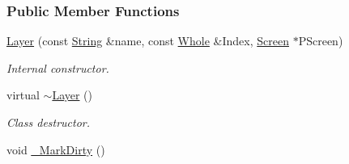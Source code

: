 \subsubsection*{Public Member Functions}
\begin{DoxyCompactItemize}
\item 
\hyperlink{classMezzanine_1_1UI_1_1Layer_aa614cada4a9187cd860cfc911ebf3448}{Layer} (const \hyperlink{namespaceMezzanine_acf9fcc130e6ebf08e3d8491aebcf1c86}{String} \&name, const \hyperlink{namespaceMezzanine_adcbb6ce6d1eb4379d109e51171e2e493}{Whole} \&Index, \hyperlink{classMezzanine_1_1UI_1_1Screen}{Screen} $\ast$PScreen)
\begin{DoxyCompactList}\small\item\em Internal constructor. \item\end{DoxyCompactList}\item 
\hypertarget{classMezzanine_1_1UI_1_1Layer_a8f900ee91964b4103ce369e82a7a0739}{
virtual \hyperlink{classMezzanine_1_1UI_1_1Layer_a8f900ee91964b4103ce369e82a7a0739}{$\sim$Layer} ()}
\label{classMezzanine_1_1UI_1_1Layer_a8f900ee91964b4103ce369e82a7a0739}

\begin{DoxyCompactList}\small\item\em Class destructor. \item\end{DoxyCompactList}\item 
\hypertarget{classMezzanine_1_1UI_1_1Layer_ad618bda408662cf17efa96cdbc5debd5}{
void \hyperlink{classMezzanine_1_1UI_1_1Layer_ad618bda408662cf17efa96cdbc5debd5}{\_\-MarkDirty} ()}
\label{classMezzanine_1_1UI_1_1Layer_ad618bda408662cf17efa96cdbc5debd5}


\end{DoxyCompactItemize}
